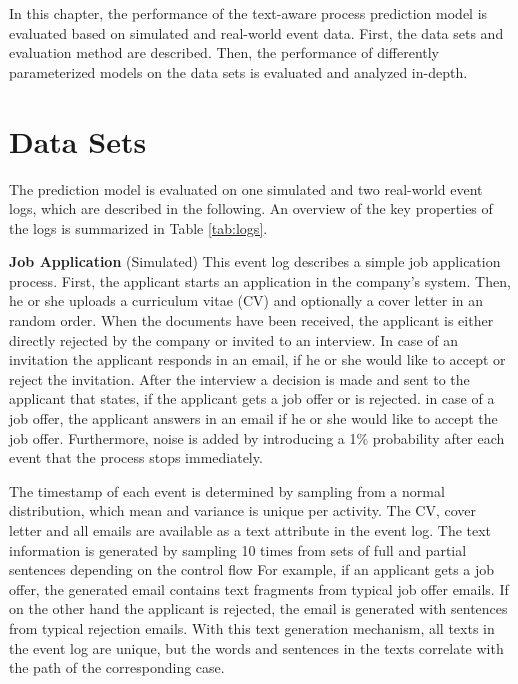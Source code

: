 In this chapter, the performance of the text-aware process prediction model is evaluated based on simulated and real-world event data.
First, the data sets and evaluation method are described. Then, the performance of differently parameterized models on the data sets is evaluated and analyzed in-depth.


\section{Data Sets}

The prediction model is evaluated on one simulated and two real-world event logs, which are described in the following.
An overview of the key properties of the logs is summarized in Table \ref{tab:logs}.

\textbf{Job Application} (Simulated) This event log describes a simple job application process. 
First, the applicant starts an application in the company's system.
Then, he or she uploads a curriculum vitae (CV) and optionally a cover letter in an random order.
When the documents have been received, the applicant is either directly rejected by the company or invited to an interview.
In case of an invitation the applicant responds in an email, if he or she would like to accept or reject the invitation.
After the interview a decision is made and sent to the applicant that states, if the applicant gets a job offer or is rejected.
in case of a job offer, the applicant answers in an email if he or she would like to accept the job offer.
Furthermore, noise is added by introducing a 1\% probability after each event that the process stops immediately.

The timestamp of each event is determined by sampling from a normal distribution, which mean and variance is unique per activity.
The CV, cover letter and all emails are available as a text attribute in the event log.
The text information is generated by sampling 10 times from sets of full and partial sentences depending on the control flow
For example, if an applicant gets a job offer, the generated email contains text fragments from typical job offer emails.
If on the other hand the applicant is rejected, the email is generated with sentences from typical rejection emails.
With this text generation mechanism, all texts in the event log are unique, but the words and sentences in the texts correlate with the path of the corresponding case.

